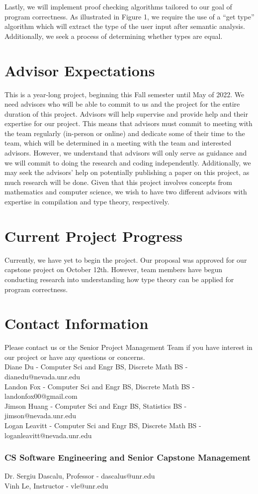 \documentclass[ 12pt ]{article}
\begin{document}
\noindent \qquad Lastly, we will implement proof checking algorithms tailored to our goal of program correctness. As illustrated in Figure 1, we require the use of a “get type” algorithm which will extract the type of the user input after semantic analysis. Additionally, we seek a process of determining whether types are equal.

\section*{Advisor Expectations}

\qquad This is a year-long project, beginning this Fall semester until May of 2022. We need advisors who will be able to commit to us and the project for the entire duration of this project. Advisors will help supervise and provide help and their expertise for our project. This means that advisors must commit to meeting with the team regularly (in-person or online) and dedicate some of their time to the team, which will be determined in a meeting with the team and interested advisors. However, we understand that advisors will only serve as guidance and we will commit to doing the research and coding independently. Additionally, we may seek the advisors’ help on potentially publishing a paper on this project, as much research will be done. Given that this project involves concepts from mathematics and computer science, we wish to have two different advisors with expertise in compilation and type theory, respectively.


\section*{Current Project Progress}

\qquad Currently, we have yet to begin the project. Our proposal was approved for our capstone project on October 12th. However, team members have begun conducting research into understanding how type theory can be applied for program correctness.


\section*{Contact Information}

\qquad Please contact us or the Senior Project Management Team if you have interest in our project or have any questions or concerns. \\

\noindent Diane Du - Computer Sci and Engr BS, Discrete Math BS - dianedu@nevada.unr.edu \\
Landon Fox - Computer Sci and Engr BS, Discrete Math BS - landonfox00@gmail.com \\
Jimson Huang - Computer Sci and Engr BS, Statistics BS - jimson@nevada.unr.edu \\
Logan Leavitt - Computer Sci and Engr BS, Discrete Math BS - loganleavitt@nevada.unr.edu \\

\subsubsection*{CS Software Engineering and Senior Capstone Management}
Dr. Sergiu Dascalu, Professor - dascalus@unr.edu \\
Vinh Le, Instructor - vle@unr.edu
\end{document}
